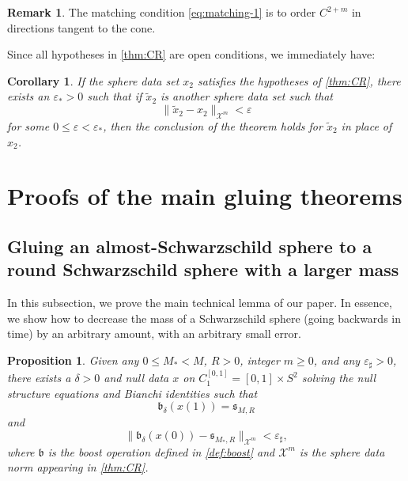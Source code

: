 \documentclass[10pt]{article}
\numberwithin{equation}{section}
\theoremstyle{plain}
\newtheorem{prop}{Proposition}[section]
\newtheorem{cor}{Corollary}
\theoremstyle{definition}
\newtheorem{rk}{Remark}[section]
\newcommand{\ve}{\varepsilon}
\begin{document}
\begin{rk}
    The matching condition \eqref{eq:matching-1} is to order $C^{2+m}$ in directions tangent to the cone. 
\end{rk}

Since all hypotheses in \cref{thm:CR} are open conditions, we immediately have:

\begin{cor}\label{cor:CR}
    If the sphere data set $x_2$ satisfies the hypotheses of \cref{thm:CR}, there exists an $\ve_*>0$ such that if $\tilde x_2$ is another sphere data set such that 
    \[\|\tilde x_2-x_2\|_{\mathcal X^m} <\ve\]
    for some $0\le \ve < \ve_*$, then the conclusion of the theorem holds for $\tilde x_2$ in place of $x_2$.
\end{cor}

\section{Proofs of the main gluing theorems}

\subsection{Gluing an almost-Schwarzschild sphere to a round Schwarzschild sphere with a larger mass}

In this subsection, we prove the main technical lemma of our paper. In essence, we show how to decrease the mass of a Schwarzschild sphere (going backwards in time) by an arbitrary amount, with an arbitrary small error. 

\begin{prop}\label{prop:Schw-perturb-Schw} Given any $0 \leq M_* < M$, $R>0$, integer $m\ge 0$, and any  $\ve_\sharp >0$, there exists a $\delta>0$ and null data $x$ on $C_1^{[0,1]}=[0,1]\times S^2$ solving the null structure equations and Bianchi identities such that 
\begin{equation}
    \mathfrak b_\delta(x(1))= \mathfrak s_{M,R}\label{eq:boost-2}
\end{equation}
and 
\begin{equation}
  \label{eq:boost-est-1}  \|\mathfrak b_\delta(x(0))-\mathfrak s_{M_*,R}\|_{\mathcal X^m} <\ve_\sharp,
\end{equation}
where $\mathfrak b$ is the boost operation defined in \cref{def:boost} and $\mathcal X^m$ is the sphere data norm appearing in \cref{thm:CR}. 
\end{prop}
\end{document}
